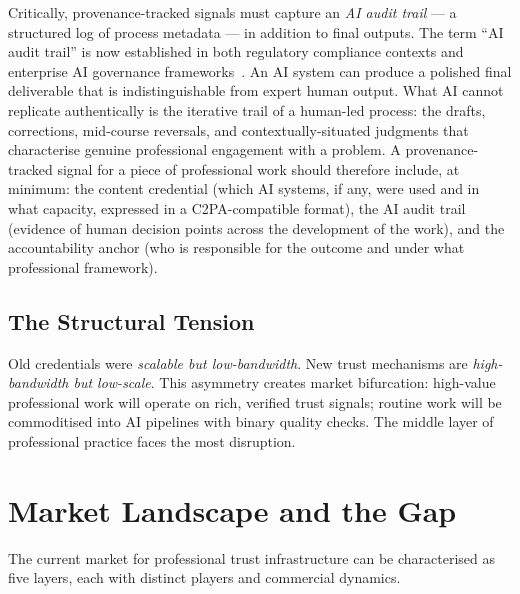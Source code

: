\documentclass[11pt,a4paper]{article}
\begin{document}
Critically, provenance-tracked signals must capture an \emph{AI audit trail} — a structured
log of process metadata — in addition to final outputs. The term ``AI audit trail'' is now
established in both regulatory compliance contexts and enterprise AI governance
frameworks~\cite{audit2025}. An AI system can produce a polished final deliverable that is
indistinguishable from expert human output. What AI cannot replicate authentically is the
iterative trail of a human-led process: the drafts, corrections, mid-course reversals, and
contextually-situated judgments that characterise genuine professional engagement with a problem.
A provenance-tracked signal for a piece of professional work should therefore include, at minimum:
the content credential (which AI systems, if any, were used and in what capacity, expressed in
a C2PA-compatible format), the AI audit trail (evidence of human decision points across the
development of the work), and the accountability anchor (who is responsible for the outcome and
under what professional framework).

\subsection{The Structural Tension}

Old credentials were \emph{scalable but low-bandwidth}. New trust mechanisms are
\emph{high-bandwidth but low-scale}. This asymmetry creates market bifurcation: high-value
professional work will operate on rich, verified trust signals; routine work will be commoditised
into AI pipelines with binary quality checks. The middle layer of professional practice faces
the most disruption.

\section{Market Landscape and the Gap}

The current market for professional trust infrastructure can be characterised as five layers,
each with distinct players and commercial dynamics.
\end{document}
